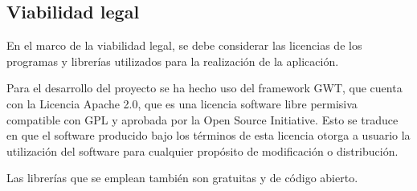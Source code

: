 \subsection{Viabilidad legal}

En el marco de la viabilidad legal, se debe considerar las licencias de los programas y librerías utilizados para la realización de la aplicación.

Para el desarrollo del proyecto se ha hecho uso del framework GWT, que cuenta con la Licencia Apache 2.0, que es una licencia software libre permisiva compatible con GPL y aprobada por la Open Source Initiative. Esto se traduce en que el software producido bajo los términos de esta licencia otorga a usuario la utilización del software para cualquier propósito de modificación o distribución.

Las librerías que se emplean también son gratuitas y de código abierto.
